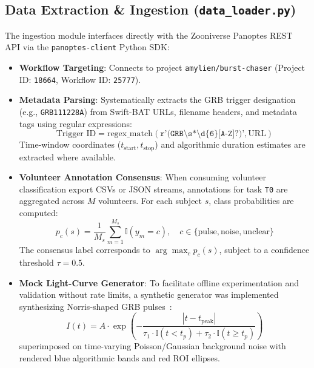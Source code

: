 \documentclass[10pt,twocolumn]{article}
\begin{document}
\subsection{Data Extraction \& Ingestion (\texttt{data\_loader.py})}
The ingestion module interfaces directly with the Zooniverse Panoptes REST API via the \texttt{panoptes-client} Python SDK:
\begin{itemize}
    \item \textbf{Workflow Targeting}: Connects to project \texttt{amylien/burst-chaser} (Project ID: \texttt{18664}, Workflow ID: \texttt{25777}).
    \item \textbf{Metadata Parsing}: Systematically extracts the GRB trigger designation (e.g., \texttt{GRB111228A}) from Swift-BAT URLs, filename headers, and metadata tags using regular expressions:
    \begin{equation}
        \text{Trigger ID} = \text{regex\_match}(\texttt{r'(GRB\textbackslash s*\textbackslash d\{6\}[A-Z]?)'}, \text{URL})
    \end{equation}
    Time-window coordinates ($t_{\text{start}}, t_{\text{stop}}$) and algorithmic duration estimates are extracted where available.
    \item \textbf{Volunteer Annotation Consensus}: When consuming volunteer classification export CSVs or JSON streams, annotations for task \texttt{T0} are aggregated across $M$ volunteers. For each subject $s$, class probabilities are computed:
    \begin{equation}
        p_c(s) = \frac{1}{M_s} \sum_{m=1}^{M_s} \mathbb{I}(y_m = c), \quad c \in \{\text{pulse}, \text{noise}, \text{unclear}\}
    \end{equation}
    The consensus label corresponds to $\arg\max_c p_c(s)$, subject to a confidence threshold $\tau = 0.5$.
    \item \textbf{Mock Light-Curve Generator}: To facilitate offline experimentation and validation without rate limits, a synthetic generator was implemented synthesizing Norris-shaped GRB pulses~\cite{norris2005energy}:
    \begin{equation}
        I(t) = A \cdot \exp\left( -\frac{|t - t_{\text{peak}}|}{\tau_1 \cdot \mathbb{I}(t < t_p) + \tau_2 \cdot \mathbb{I}(t \ge t_p)} \right)
    \end{equation}
    superimposed on time-varying Poisson/Gaussian background noise with rendered blue algorithmic bands and red ROI ellipses.
\end{itemize}
\end{document}
